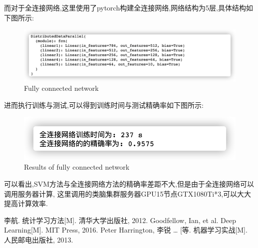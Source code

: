 \documentclass[UTF8,a4paper,11pt]{ctexart}
\begin{document}
而对于全连接网络,这里使用了pytorch构建全连接网络,网络结构为5层,具体结构如下图所示:
\begin{figure}[H]
	\centering
	\includegraphics[width=\textwidth,height=0.5\textwidth]{net.png}
	\caption{Fully connected network}
\end{figure}
进而执行训练与测试,可以得到训练时间与测试精确率如下图所示:
\begin{figure}[H]
	\centering
	\includegraphics[width=\textwidth,height=0.2\textwidth]{FC_result.png}
	\caption{Results of fully connected network}
\end{figure}
可以看出,SVM方法与全连接网络方法的精确率差距不大,但是由于全连接网络可以调用服务器计算,
这里调用的类脑集群服务器GPU15节点GTX1080Ti*3,可以大大提高计算效率.
\newpage
\begin{thebibliography}{3}  
	 李航. 统计学习方法[M]. 清华大学出版社, 2012.
	 Goodfellow, Ian, et al. Deep Learning[M]. MIT Press, 2016. 	
	 Peter Harrington, 李锐 … [等. 机器学习实战[M]. 人民邮电出版社, 2013.
\end{thebibliography}
\end{document}
